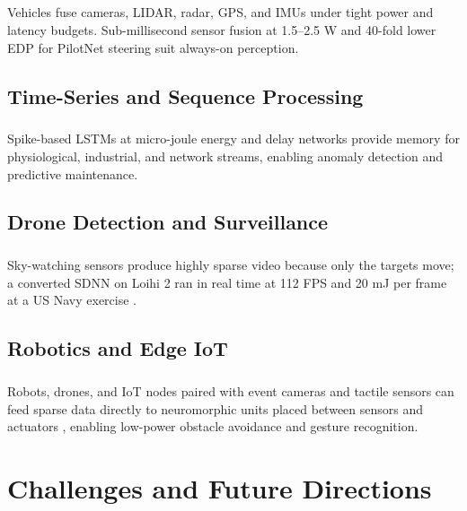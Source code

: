 \documentclass[12pt,a4paper,final]{extreport}
\begin{document}
\paragraph{} Vehicles fuse cameras, LIDAR, radar, GPS, and IMUs under tight power and latency budgets. Sub-millisecond sensor fusion at 1.5--2.5 W \cite{p2} and 40-fold lower EDP for PilotNet steering \cite{p4} suit always-on perception.

\section{Time-Series and Sequence Processing}

\paragraph{} Spike-based LSTMs at micro-joule energy \cite{p3} and delay networks \cite{p1} provide memory for physiological, industrial, and network streams, enabling anomaly detection and predictive maintenance.

\section{Drone Detection and Surveillance}

\paragraph{} Sky-watching sensors produce highly sparse video because only the targets move; a converted SDNN on Loihi 2 ran in real time at 112 FPS and 20 mJ per frame at a US Navy exercise \cite{p4}.

\section{Robotics and Edge IoT}

\paragraph{} Robots, drones, and IoT nodes paired with event cameras and tactile sensors can feed sparse data directly to neuromorphic units placed between sensors and actuators \cite{p2}, enabling low-power obstacle avoidance and gesture recognition.

\chapter{Challenges and Future Directions}
\end{document}
